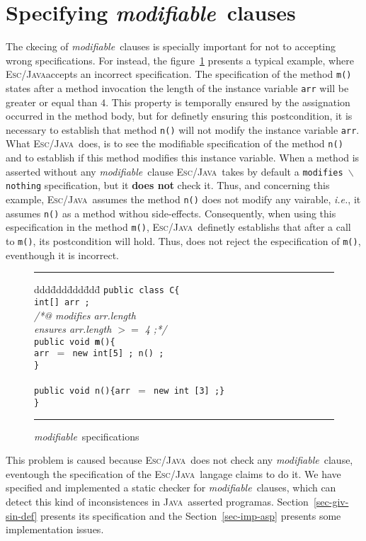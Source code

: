 \documentclass[a4paper]{llncs}
\newcommand{\escj}{\textsc{Esc/Java}}
\newcommand{\java}{\textsc{Java}}
\newcommand{\modif}{\textit{modifiable}}
\begin{document}
\section{Specifying \modif~clauses}
\label{sec-sem-mod-cla}
The ckecing of \modif~clauses is specially important for not to accepting wrong specifications. For instead, the figure~\ref{fig-mod-spe} presents a typical example, where \escj accepts an incorrect specification. The specification of the method \texttt{m()} states after a method invocation the length of the instance variable \texttt{arr} will be greater or equal than $4$. This property is temporally ensured by the assignation occurred in the method body, but for definetly ensuring this postcondition, it is necessary to establish that method \texttt{n()} will not modify the instance variable \texttt{arr}. What \escj~does, is to see the modifiable specification of the method \texttt{n()} and to establish if this method modifies this instance variable. When a method is asserted without any \modif~clause \escj~takes by default a \texttt{modifies $\backslash$nothing} specification, but it {\bf does not} check it. Thus, and concerning this example, \escj~assumes the method \texttt{n()} does not modify any vairable, \emph{i.e.}, it assumes \texttt{n()} as a method withou side-effects. Consequently, when using this especification in the method \texttt{m()}, \escj~definetly establishs that after a call to \texttt{m()}, its postcondition will hold. Thus, does not reject the especification of \texttt{m()}, eventhough it is incorrect.
\begin{figure}[htb]
\rule{\linewidth}{0.25mm}
\begin{tabbing}
ddd\=ddd\=ddd\=ddd\= \kill 
\texttt{public class C\{} \\
\>\texttt{int[] arr ;} \\
\>\textsl{/*@ modifies arr.length}  \\
\>\>\textsl{ ensures arr.length $>=$ 4 ;*/} \\
\>\texttt{public void {\bf m}()\{} \\
\>\>\texttt{arr $=$ new int[5] ; n() ;} \\
\>\texttt{\}} \\
\\
\>\texttt{public void n()\{arr $=$ new int [3] ;\}} \\
\texttt{\}}
\end{tabbing}
\caption{\modif~specifications} 
\label{fig-mod-spe} 
\rule{\linewidth}{0.25mm} 
\end{figure} 
This problem is caused because \escj~does not check any \modif~clause,
eventough the specification of the \escj~langage claims to do it. We
have specified and implemented a static checker for \modif~clauses,
which can detect this kind of inconsistences in \java~asserted
programas. Section~\ref{sec-giv-sin-def} presents its specification
and the Section~\ref{sec-imp-asp} presents some implementation
issues.
\end{document}
